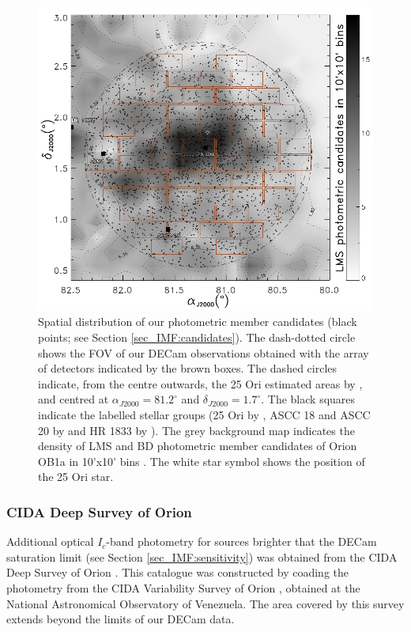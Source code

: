 \documentclass[12pt]{article}
\begin{document}
\begin{figure}
	\includegraphics[width=1.0\textwidth]{sky}
	\caption[Spatial distribution of our photometric member candidates.]{Spatial distribution of our photometric member candidates (black points; see Section \ref{sec_IMF:candidates}). The dash-dotted circle shows the FOV of our DECam observations obtained with the array of detectors indicated by the brown boxes. The dashed circles indicate, from the centre outwards, the 25 Ori estimated areas by \citet[0.5$^\circ$ radius; ][]{Downes2014}, \citet[0.7$^\circ$ radius; ][]{Briceno2018} and \citet[1.0$^\circ$ radius; ][]{Briceno2005,Briceno2007} centred at $\alpha_{J2000}=81.2^\circ$ and $\delta_{J2000}=1.7^\circ$. The black squares indicate the labelled stellar groups (25 Ori by \citealt{Briceno2005}, ASCC 18 and ASCC 20 by \citealt{Kharchenko2013} and HR 1833 by \citealt{Briceno2018}). The grey background map indicates the density of LMS and BD photometric member candidates of Orion OB1a in 10'x10' bins \citep{Downes2014}. The white star symbol shows the position of the 25 Ori star.}
	\label{fig_IMF:sky}
\end{figure}

\subsubsection{CIDA Deep Survey of Orion}
\label{sec_IMF:CDSO}

Additional optical $I_c$-band photometry for sources brighter that the DECam saturation limit (see Section \ref{sec_IMF:sensitivity}) was obtained from the CIDA Deep Survey of Orion \citep[\ac{CDSO}; ][]{Downes2014}. This catalogue was constructed by coading the photometry from the CIDA Variability Survey of Orion \citep[\ac{CVSO}; ][]{Briceno2005,Mateu2012,Briceno2018}, obtained at the National Astronomical Observatory of Venezuela. The area covered by this survey extends beyond the limits of our DECam data.
\end{document}
